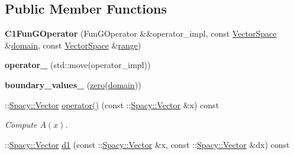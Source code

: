 \subsection*{\-Public \-Member \-Functions}
\begin{DoxyCompactItemize}
\item 
\hypertarget{classSpacy_1_1dealII_1_1C1FunGOperator_a933586798c70e039988f074550df1fac}{{\bfseries \-C1\-Fun\-G\-Operator} (\-Fun\-G\-Operator \&\&operator\-\_\-impl, const \hyperlink{classSpacy_1_1VectorSpace}{\-Vector\-Space} \&\hyperlink{classSpacy_1_1OperatorBase_a2588f9b3e0188820c4c494e63293dc6f}{domain}, const \hyperlink{classSpacy_1_1VectorSpace}{\-Vector\-Space} \&\hyperlink{classSpacy_1_1OperatorBase_ab19d3b7a6f290b1079248f1e567e53d6}{range})}\label{classSpacy_1_1dealII_1_1C1FunGOperator_a933586798c70e039988f074550df1fac}

\item 
\hypertarget{classSpacy_1_1dealII_1_1C1FunGOperator_a0ca2c7776286874ede558195e8af1d3f}{{\bfseries operator\-\_\-} (std\-::move(operator\-\_\-impl))}\label{classSpacy_1_1dealII_1_1C1FunGOperator_a0ca2c7776286874ede558195e8af1d3f}

\item 
\hypertarget{classSpacy_1_1dealII_1_1C1FunGOperator_abf16c95bd34bc079c0652141f9452722}{{\bfseries boundary\-\_\-values\-\_\-} (\hyperlink{namespaceSpacy_ac7f0661bfdb52144b9ff0b9bbdd81f69}{zero}(\hyperlink{classSpacy_1_1OperatorBase_a2588f9b3e0188820c4c494e63293dc6f}{domain}))}\label{classSpacy_1_1dealII_1_1C1FunGOperator_abf16c95bd34bc079c0652141f9452722}

\item 
\hypertarget{classSpacy_1_1dealII_1_1C1FunGOperator_a9ac974cc0e7902429e7c934a3492eda9}{\-::\hyperlink{classSpacy_1_1Vector}{\-Spacy\-::\-Vector} \hyperlink{classSpacy_1_1dealII_1_1C1FunGOperator_a9ac974cc0e7902429e7c934a3492eda9}{operator()} (const \-::\hyperlink{classSpacy_1_1Vector}{\-Spacy\-::\-Vector} \&x) const }\label{classSpacy_1_1dealII_1_1C1FunGOperator_a9ac974cc0e7902429e7c934a3492eda9}

\begin{DoxyCompactList}\small\item\em \-Compute $A(x)$. \end{DoxyCompactList}\item 
\hypertarget{classSpacy_1_1dealII_1_1C1FunGOperator_a641167af4009642b4266fa8c76121cf6}{\-::\hyperlink{classSpacy_1_1Vector}{\-Spacy\-::\-Vector} \hyperlink{classSpacy_1_1dealII_1_1C1FunGOperator_a641167af4009642b4266fa8c76121cf6}{d1} (const \-::\hyperlink{classSpacy_1_1Vector}{\-Spacy\-::\-Vector} \&x, const \-::\hyperlink{classSpacy_1_1Vector}{\-Spacy\-::\-Vector} \&dx) const }\label{classSpacy_1_1dealII_1_1C1FunGOperator_a641167af4009642b4266fa8c76121cf6}


\end{DoxyCompactItemize}
